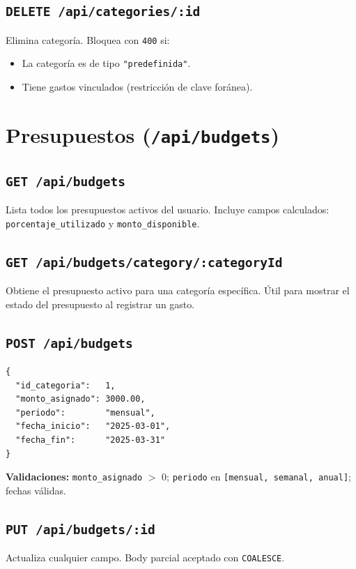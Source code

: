 \subsection{\texttt{DELETE /api/categories/:id}}
Elimina categoría. Bloquea con \texttt{400} si:
\begin{itemize}
  \item La categoría es de tipo \texttt{"predefinida"}.
  \item Tiene gastos vinculados (restricción de clave foránea).
\end{itemize}

\section{Presupuestos (\texttt{/api/budgets})}

\subsection{\texttt{GET /api/budgets}}
Lista todos los presupuestos activos del usuario. Incluye campos calculados: \texttt{porcentaje\_utilizado} y \texttt{monto\_disponible}.

\subsection{\texttt{GET /api/budgets/category/:categoryId}}
Obtiene el presupuesto activo para una categoría específica. Útil para mostrar el estado del presupuesto al registrar un gasto.

\subsection{\texttt{POST /api/budgets}}
\begin{lstlisting}[style=json]
{
  "id_categoria":   1,
  "monto_asignado": 3000.00,
  "periodo":        "mensual",
  "fecha_inicio":   "2025-03-01",
  "fecha_fin":      "2025-03-31"
}
\end{lstlisting}
\textbf{Validaciones:} \texttt{monto\_asignado} $>$ 0; \texttt{periodo} en \texttt{[mensual, semanal, anual]}; fechas válidas.

\subsection{\texttt{PUT /api/budgets/:id}} Actualiza cualquier campo. Body parcial aceptado con \texttt{COALESCE}.

